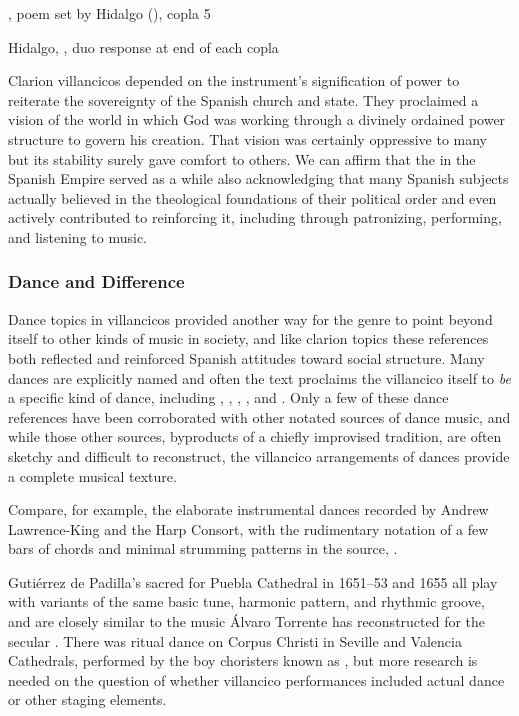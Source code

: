 {, poem set by Hidalgo (), copla 5}

{Hidalgo, , duo response at end of each copla}

Clarion villancicos depended on the instrument's signification of power to
reiterate the sovereignty of the Spanish church and state.
They proclaimed a vision of the world in which God was working through a
divinely ordained power structure to govern his creation.
That vision was certainly oppressive to many but its stability surely gave
comfort to others.
We can affirm that the  in the Spanish Empire served as
a  while also acknowledging that many Spanish
subjects actually believed in the theological foundations of their political
order and even actively contributed to reinforcing it, including through
patronizing, performing, and listening to music.%
    \Autocites
    {Rodriguez:Villancico}
    {Sage:Instrumentum}

\subsubsection{Dance and Difference}

Dance topics in villancicos provided another way for the genre to point beyond
itself to other kinds of music in society, and like clarion topics these
references both reflected and reinforced Spanish attitudes toward social
structure.
Many dances are explicitly named and often the text proclaims the villancico
itself to \emph{be} a specific kind of dance, including ,
, , , and
.%
    \citXXX[sources]
Only a few of these dance references have been corroborated with other notated
sources of dance music, and while those other sources, byproducts of a chiefly
improvised tradition, are often sketchy and difficult to reconstruct, the
villancico arrangements of dances provide a complete musical texture.%
\begin{Footnote}
    Compare, for example, the elaborate instrumental dances recorded by Andrew
    Lawrence-King and the Harp Consort, 
    with the rudimentary notation of a few bars of chords and minimal strumming
    patterns in the source, .
\end{Footnote}
Gutiérrez de Padilla's sacred  for Puebla Cathedral in 1651--53
and 1655 all play with variants of the same basic tune, harmonic pattern, and
rhythmic groove, and are closely similar to the music Álvaro Torrente has
reconstructed for the secular .%
    \Autocite{Torrente:Jacara}
There was ritual dance on Corpus Christi in Seville and Valencia Cathedrals,
performed by the boy choristers known as , but more research is
needed on the question of whether villancico performances included actual dance
or other staging elements.%
    \Autocite{Comes:Danzas}

